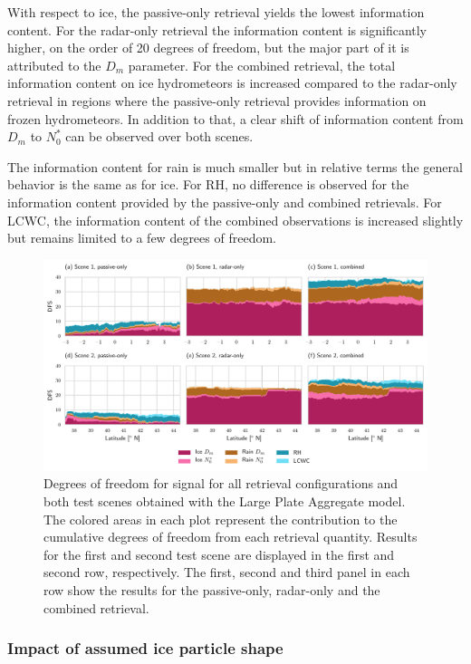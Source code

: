 \documentclass[journal abbreviation, manuscript]{copernicus}
\begin{document}
With respect to ice, the passive-only retrieval yields the lowest information
content. For the radar-only retrieval the information content is significantly
higher, on the order of 20 degrees of freedom, but the major part of it is
attributed to the $D_m$ parameter. For the combined retrieval, the total
information content on ice hydrometeors is increased compared to the radar-only
retrieval in regions where the passive-only retrieval provides information on
frozen hydrometeors. In addition to that, a clear shift of information content
from $D_m$ to $N_0^*$ can be observed over both scenes.

The information content for rain is much smaller but in relative terms the
general behavior is the same as for ice. For RH, no difference is observed for
the information content provided by the passive-only and combined retrievals.
For LCWC, the information content of the combined observations is increased
slightly but remains limited to a few degrees of freedom.

\begin{figure}
\centering
\includegraphics[width = 1.0\textwidth]{../plots/dfs}
\caption{Degrees of freedom for signal for all retrieval configurations and both
  test scenes obtained with the Large Plate Aggregate model. The colored areas
  in each plot represent the contribution to the cumulative degrees of freedom
  from each retrieval quantity. Results for the first and second test scene
  are displayed in the first and second row, respectively. The first, second
  and third panel in each row show the results for the passive-only, radar-only
  and the combined retrieval.}
\label{fig:dfs}
\end{figure}

\subsubsection{Impact of assumed ice particle shape}
\end{document}
